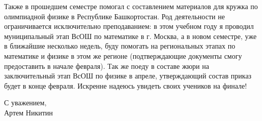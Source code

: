 \quad Также в прошедшем семестре помогал с составлением материалов для кружка по олимпиадной физике в Республике Башкортостан. Род деятельности
не ограничивается исключительно преподаванием: в этом учебном году я проводил муниципальный этап ВсОШ по математике в г. Москва, а в новом
семестре, уже в ближайшие несколько недель, буду помогать на региональных этапах по математике и физике в этом же регионе (подтверждающие
документы смогу предоставить в начале февраля). Так же поеду в составе жюри на заключительный этап ВсОШ по физике в апреле, утверждающий состав
приказ будет в конце февраля. Искренне надеюсь увидеть своих учеников на финале!

\begin{flushright}
    С уважением, \\
    Артем Никитин
\end{flushright}
